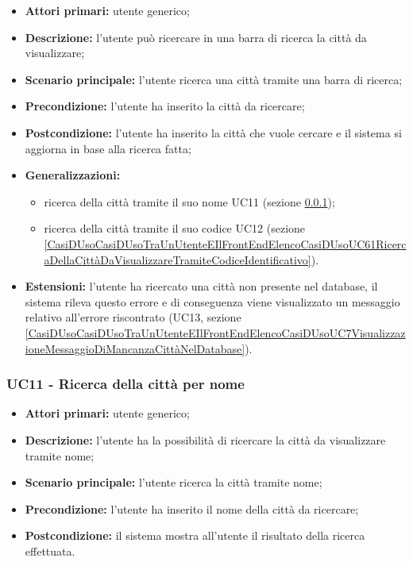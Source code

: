 \begin{itemize}
	\item \textbf{Attori primari:} utente generico;
	\item \textbf{Descrizione:} l’utente può ricercare in una barra di ricerca la città da visualizzare;
	\item \textbf{Scenario principale:} l’utente ricerca una città tramite una barra di ricerca;
	\item \textbf{Precondizione:} l’utente ha inserito la città da ricercare;
	\item \textbf{Postcondizione:} l’utente ha inserito la città che vuole cercare e il sistema si aggiorna in base alla ricerca fatta;
	\item \textbf{Generalizzazioni:}
	\begin{itemize}
		\item ricerca della città tramite il suo nome UC11 (sezione \ref{CasiDUsoCasiDUsoTraUnUtenteEIlFrontEndElencoCasiDUsoUC52RicercaDellaCittàDaVisualizzareTramiteNome});
		\item ricerca della città tramite il suo codice UC12 (sezione \ref{CasiDUsoCasiDUsoTraUnUtenteEIlFrontEndElencoCasiDUsoUC61RicercaDellaCittàDaVisualizzareTramiteCodiceIdentificativo}).
	\end{itemize}
	\item \textbf{Estensioni:} l’utente ha ricercato una città non presente nel database, il sistema rileva questo errore e di conseguenza viene visualizzato un messaggio relativo all’errore riscontrato (UC13, sezione \ref{CasiDUsoCasiDUsoTraUnUtenteEIlFrontEndElencoCasiDUsoUC7VisualizzazioneMessaggioDiMancanzaCittàNelDatabase}).
\end{itemize}


\subsubsection{UC11 - Ricerca della città per nome}\label{CasiDUsoCasiDUsoTraUnUtenteEIlFrontEndElencoCasiDUsoUC52RicercaDellaCittàDaVisualizzareTramiteNome}

\begin{itemize}
	\item \textbf{Attori primari:} utente generico;
	\item \textbf{Descrizione:} l’utente ha la possibilità di ricercare la città da visualizzare tramite nome;
	\item \textbf{Scenario principale:} l’utente ricerca la città tramite nome;
	\item \textbf{Precondizione:} l’utente ha inserito il nome della città da ricercare;
	\item \textbf{Postcondizione:} il sistema mostra all’utente il risultato della ricerca effettuata.
\end{itemize}

